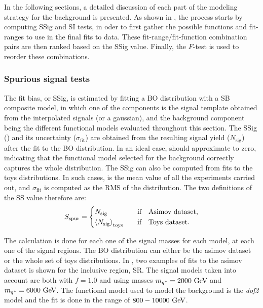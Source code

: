 In the following sections, a detailed discussion of each part of the modeling strategy for the background is presented. As shown in \Fig{\ref{fig:bkg:modeling:strategy:fitmodel_validation}}, the process starts by computing \ac{SSig} and \ac{SI} tests, in oder to first gather the possible functions and fit-ranges to use in the final fits to data. These fit-range/fit-function combination pairs are then ranked based on the \ac{SSig} value. Finally, the \(F\)-test is used to reorder these combinations.

\subsubsection{Spurious signal tests}
\label{subsubsec:bkg:modeling:sigbkg:sstest}

The fit bias, or \acf{SSig}, is estimated by fitting a \ac{BO} distribution with a \ac{SB} composite model, in which one of the components is the signal template obtained from the interpolated signals (or a gaussian), and the background component being the different functional models evaluated throughout this section.
The \ac{SSig} (\sspur) and its uncertainty (\(\sigma_{\text{fit}}\)) are obtained from the resulting signal yield (\(N_{\text{sig}}\)) after the fit to the \ac{BO} distribution. In an ideal case, \sspur should approximate to zero, indicating that the functional model selected for the background correctly captures the whole distribution.
The \ac{SSig} can also be computed from fits to the toys distributions. In such cases, \sspur is the mean value of all the experiments carried out, and \(\sigma_{\text{fit}}\) is computed as the RMS of the \sspur distribution. The two definitions of the \ac{SS} value therefore are:
\begin{equation}
    \label{eq:bkg:modeling:sigbkg:sstest:sspur_definition_sstest}
    \sspur = 
    \begin{cases}
        N_{\text{sig}} & \qif \text{Asimov dataset},\\
        \expval{N_{\text{sig}}}_{\text{toys}} & \qif \text{Toys dataset}.
    \end{cases}
\end{equation}

The calculation is done for each one of the signal masses for each model, at each one of the signal regions. The \ac{BO} distribution can either be the asimov dataset or the whole set of toys distributions. In \Fig{\ref{fig:bkg:modeling:sigbkg:sstest:sstest_asimov_examples}}, two examples of fits to the asimov dataset is shown for the inclusive region, SR. The signal models taken into account are both \qstar with \(f=1.0\) and using masses \(m_{q^*} = 2000~\text{GeV}\) and \(m_{q^*} = 6000~\text{GeV}\). The functional model used to model the background is the \textit{dof2} model and the fit is done in the \myj range of \(800-10000~\text{GeV}\).


